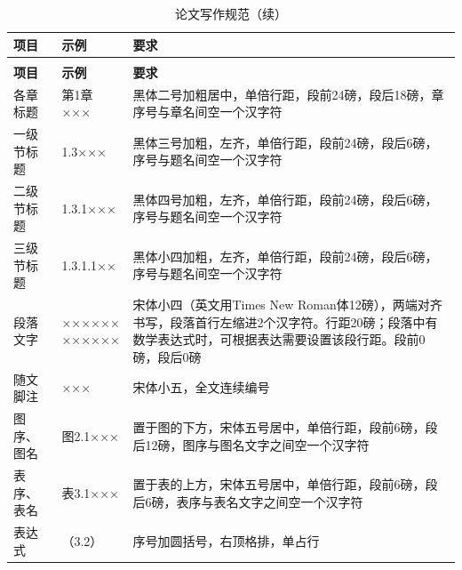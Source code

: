 \par
\begingroup
\bistutablefont
\setlength{\tabcolsep}{5bp}
\setlength{\heavyrulewidth}{1.5bp}
\setlength{\lightrulewidth}{0.75bp}
\setlength{\LTleft}{\fill}
\setlength{\LTright}{\fill}
\renewcommand{\arraystretch}{1.2}
\begin{longtable}{@{}C{2.2cm}C{2.8cm}C{9.6cm}@{}}
  \caption{论文写作规范}\label{tab:word-format-requirements}\\
  \toprule
  \textbf{项目} & \textbf{示例} & \textbf{要求} \\
  \midrule
  \endfirsthead
  \caption[]{论文写作规范（续）}\\
  \toprule
  \textbf{项目} & \textbf{示例} & \textbf{要求} \\
  \midrule
  \endhead
  \bottomrule
  \endfoot
  各章标题 & 第1章\quad ××× & 黑体二号加粗居中，单倍行距，段前24磅，段后18磅，章序号与章名间空一个汉字符 \\[6bp]
  一级节标题 & 1.3\quad ××× & 黑体三号加粗，左齐，单倍行距，段前24磅，段后6磅，序号与题名间空一个汉字符 \\[6bp]
  二级节标题 & 1.3.1\quad ××× & 黑体四号加粗，左齐，单倍行距，段前24磅，段后6磅，序号与题名间空一个汉字符 \\[6bp]
  三级节标题 & 1.3.1.1\quad ×× & 黑体小四加粗，左齐，单倍行距，段前24磅，段后6磅，序号与题名间空一个汉字符 \\[6bp]
  段落文字 &  & 宋体小四（英文用Times New Roman体12磅），两端对齐书写，段落首行左缩进2个汉字符。行距20磅；段落中有数学表达式时，可根据表达需要设置该段行距。段前0磅，段后0磅 \\[6bp]
  随文脚注 & ××× & 宋体小五，全文连续编号 \\[6bp]
  图序、图名 & 图2.1\quad ××× & 置于图的下方，宋体五号居中，单倍行距，段前6磅，段后12磅，图序与图名文字之间空一个汉字符 \\[6bp]
  表序、表名 & 表3.1\quad ××× & 置于表的上方，宋体五号居中，单倍行距，段前6磅，段后6磅，表序与表名文字之间空一个汉字符 \\[6bp]
  表达式 & （3.2） & 序号加圆括号，右顶格排，单占行 \\
\end{longtable}
\endgroup
